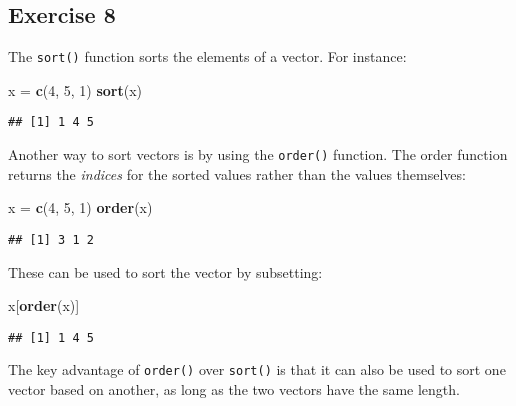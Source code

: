 \documentclass[
]{article}
\newenvironment{Shaded}{\begin{snugshade}}{\end{snugshade}}
\newcommand{\DecValTok}[1]{\textcolor[rgb]{0.00,0.00,0.81}{#1}}
\newcommand{\KeywordTok}[1]{\textcolor[rgb]{0.13,0.29,0.53}{\textbf{#1}}}
\newcommand{\NormalTok}[1]{#1}
\newcommand{\StringTok}[1]{\textcolor[rgb]{0.31,0.60,0.02}{#1}}
\begin{document}
\hypertarget{exercise-8}{%
\subsection{Exercise 8}\label{exercise-8}}

The \texttt{sort()} function sorts the elements of a vector. For
instance:

\begin{Shaded}
\begin{Highlighting}[]
\NormalTok{x =}\StringTok{ }\KeywordTok{c}\NormalTok{(}\DecValTok{4}\NormalTok{, }\DecValTok{5}\NormalTok{, }\DecValTok{1}\NormalTok{)}
\KeywordTok{sort}\NormalTok{(x)}
\end{Highlighting}
\end{Shaded}

\begin{verbatim}
## [1] 1 4 5
\end{verbatim}

Another way to sort vectors is by using the \texttt{order()} function.
The order function returns the \emph{indices} for the sorted values
rather than the values themselves:

\begin{Shaded}
\begin{Highlighting}[]
\NormalTok{x =}\StringTok{ }\KeywordTok{c}\NormalTok{(}\DecValTok{4}\NormalTok{, }\DecValTok{5}\NormalTok{, }\DecValTok{1}\NormalTok{)}
\KeywordTok{order}\NormalTok{(x)}
\end{Highlighting}
\end{Shaded}

\begin{verbatim}
## [1] 3 1 2
\end{verbatim}

These can be used to sort the vector by subsetting:

\begin{Shaded}
\begin{Highlighting}[]
\NormalTok{x[}\KeywordTok{order}\NormalTok{(x)]}
\end{Highlighting}
\end{Shaded}

\begin{verbatim}
## [1] 1 4 5
\end{verbatim}

The key advantage of \texttt{order()} over \texttt{sort()} is that it
can also be used to sort one vector based on another, as long as the two
vectors have the same length.
\end{document}

